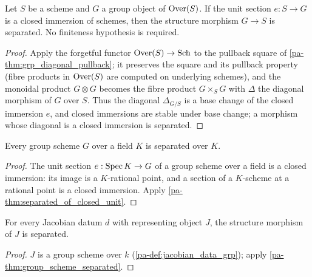 \begin{theorem}
  \label{pa-thm:separated_of_closed_unit}
  \leanok

  Let \(S\) be a scheme and \(G\) a group object of \(\mathrm{Over}(S)\). If the unit
  section \(e : S \to G\) is a closed immersion of schemes, then the structure
  morphism \(G \to S\) is separated. No finiteness hypothesis is required.
\end{theorem}
\begin{proof}
  \leanok
  Apply the forgetful functor \(\mathrm{Over}(S) \to \mathrm{Sch}\) to the pullback
  square of \ref{pa-thm:grp_diagonal_pullback}; it preserves the square and its
  pullback property (fibre products in \(\mathrm{Over}(S)\) are computed on underlying
  schemes), and the monoidal product \(G \otimes G\) becomes the fibre product
  \(G \times_S G\) with \(\Delta\) the diagonal morphism of \(G\) over \(S\).
  Thus the diagonal \(\Delta_{G/S}\) is a base change of the closed immersion
  \(e\), and closed immersions are stable under base change; a morphism whose
  diagonal is a closed immersion is separated.
\end{proof}

\begin{theorem}
  \label{pa-thm:group_scheme_separated}
  \leanok

  Every group scheme \(G\) over a field \(K\) is separated over \(K\).
\end{theorem}
\begin{proof}
  \leanok
  The unit section \(e : \operatorname{Spec} K \to G\) of a group scheme over a field is a
  closed immersion: its image is a \(K\)-rational point, and a section of a
  \(K\)-scheme at a rational point is a closed immersion. Apply
  \ref{pa-thm:separated_of_closed_unit}.
\end{proof}

\begin{corollary}
  \label{pa-cor:jacobianData_separated}
  \leanok

  For every Jacobian datum \(d\) with representing object \(J\), the structure
  morphism of \(J\) is separated.
\end{corollary}
\begin{proof}
  \leanok
  \(J\) is a group scheme over \(k\) (\ref{pa-def:jacobian_data_grp}); apply
  \ref{pa-thm:group_scheme_separated}.
\end{proof}

